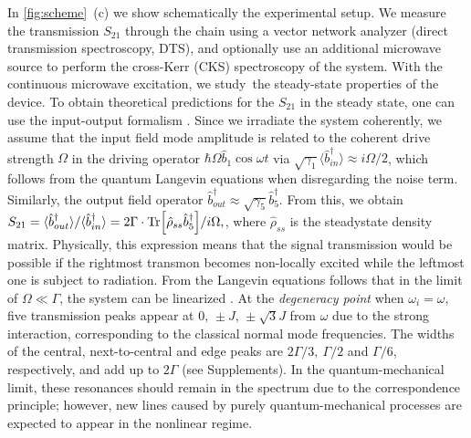 \documentclass[%
 aps, pra,
 amsmath,amssymb,
 reprint,%
superscriptaddress
]{revtex4-2}
\begin{document}
In \autoref{fig:scheme}~(c) we show schematically the experimental setup. We measure the transmission $S_{21}$ through the chain using a vector network analyzer (direct transmission spectroscopy, DTS), and optionally use an additional microwave source to perform the cross-Kerr (CKS) spectroscopy of the system. With the continuous microwave excitation, we study the steady-state properties of the device. To obtain theoretical predictions for the $S_{21}$ in the steady state, one can use the input-output formalism \cite{yurke1984quantum,gardiner1985input}. Since we irradiate the system coherently, we assume that the input field mode amplitude is related to the coherent drive strength $\Omega$ in the driving operator $\hbar \Omega \hat b_1 \cos \omega t$ via $\sqrt{\gamma_1} \langle  \hat b_{in}^\dag \rangle \approx i \Omega/2$, which follows from the quantum Langevin equations when disregarding the noise term. Similarly, the output field operator $\hat b_{out}^\dag \approx \sqrt{\gamma_5} \hat b_5^\dag$. From this, we obtain $
	S_{21} = \langle \hat b_{out}^\dag\rangle / \langle \hat b_{in}^\dag \rangle = 2\Gamma\cdot \Tr[\hat \rho_{ss} \hat b_5^\dag]/{i\Omega} ,
$,
where $\hat \rho_{ss}$ is the steadystate density matrix. Physically, this expression means that the signal transmission would be possible if the rightmost transmon becomes non-locally excited while the leftmost one is subject to radiation. From the Langevin equations follows that in the limit of $\Omega \ll \Gamma$, the system can be linearized \cite{astafiev2010resonance}. At the \textit{degeneracy point} when $\omega_i = \omega$, five transmission peaks appear at $0,\, \pm J,\, \pm \sqrt{3} J$ from $\omega$ due to the strong interaction, corresponding to the classical normal mode frequencies. The widths of the central, next-to-central and edge peaks are $2\Gamma/3,\ \Gamma/2$ and $\Gamma/6$, respectively, and add up to $2\Gamma$ (see Supplements).  In the quantum-mechanical limit, these resonances should remain in the spectrum due to the correspondence principle; however, new lines caused by purely quantum-mechanical processes are expected to appear in the nonlinear regime.
\end{document}
